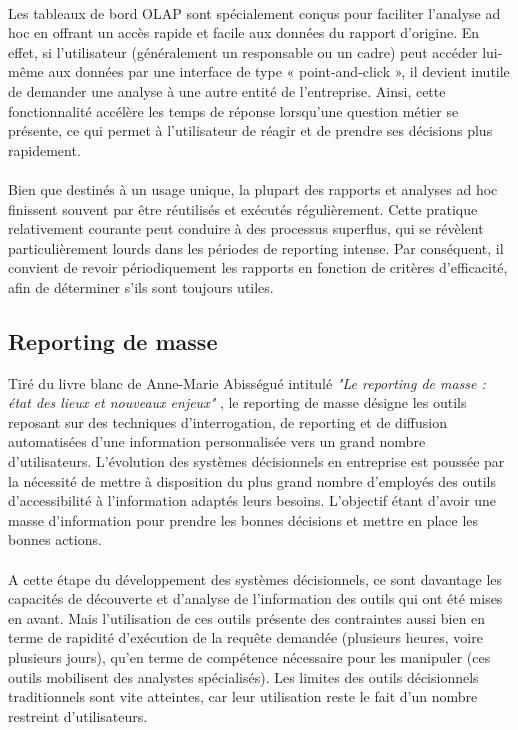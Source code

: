 \paragraph{}
Les tableaux de bord OLAP sont spécialement conçus pour faciliter l'analyse ad hoc en offrant un accès rapide et facile aux données du rapport d'origine. En effet, si l'utilisateur (généralement un responsable ou un cadre) peut accéder lui-même aux données par une interface de type « point-and-click », il devient inutile de demander une analyse à une autre entité de l'entreprise. Ainsi, cette fonctionnalité accélère les temps de réponse lorsqu'une question métier se présente, ce qui permet à l'utilisateur de réagir et de prendre ses décisions plus rapidement.
\paragraph{}
Bien que destinés à un usage unique, la plupart des rapports et analyses ad hoc finissent souvent par être réutilisés et exécutés régulièrement. Cette pratique relativement courante peut conduire à des processus superflus, qui se révèlent particulièrement lourds dans les périodes de reporting intense. Par conséquent, il convient de revoir périodiquement les rapports en fonction de critères d'efficacité, afin de déterminer s'ils sont toujours utiles.

\subsection{Reporting de masse}
Tiré du livre blanc de Anne-Marie Abisségué intitulé \textit{"Le reporting de masse : état des lieux et nouveaux enjeux"} \cite{book:13}, le reporting de masse désigne les outils reposant sur des techniques d'interrogation, de reporting et de diffusion automatisées d'une information personnalisée vers un grand nombre d'utilisateurs. L'évolution des systèmes décisionnels en entreprise est poussée par la nécessité de mettre à disposition du plus grand nombre d’employés des outils d’accessibilité à l’information adaptés leurs besoins. L'objectif étant d'avoir une masse d’information pour prendre les bonnes décisions et mettre en place les bonnes actions.
\paragraph{}
A cette étape du développement des systèmes décisionnels, ce sont davantage les capacités de découverte et d'analyse de l'information des outils qui ont été mises en avant. Mais l'utilisation de ces outils présente des contraintes aussi bien en terme de rapidité d'exécution de la requête demandée (plusieurs heures, voire plusieurs jours), qu'en terme de compétence nécessaire pour les manipuler (ces outils mobilisent des analystes spécialisés). Les limites des outils décisionnels traditionnels sont vite atteintes, car leur utilisation reste le fait d'un nombre restreint d'utilisateurs.

